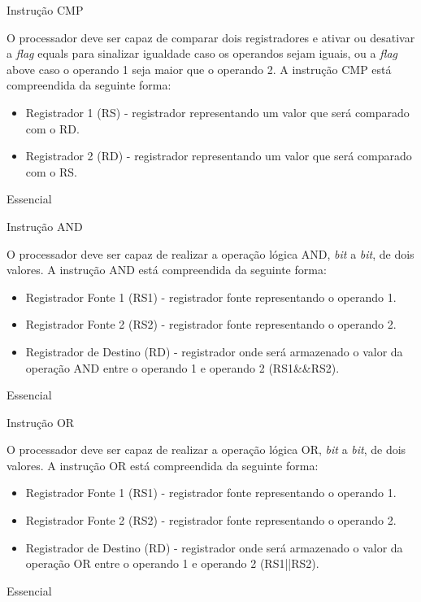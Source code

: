 \documentclass{article}
\begin{document}
\begin{functional}
     \requirement
      {Instrução CMP}
      {O processador deve ser capaz de comparar dois registradores e ativar ou desativar a \textit{flag} equals para sinalizar igualdade caso os operandos sejam iguais, ou a \textit{flag} above caso o operando 1 seja maior que o operando 2.
      A instrução CMP está compreendida da seguinte forma:\\
      \begin{itemize}
       \item Registrador 1 (RS) - registrador representando um valor que será comparado com o RD.
       \item Registrador 2 (RD) - registrador representando um valor que será comparado com o RS.
      \end{itemize}
      }
      {Essencial}

      \requirement
      {Instrução AND}
      {O processador deve ser capaz de realizar a operação lógica AND, \textit{bit} a \textit{bit}, de dois valores.
      A instrução AND está compreendida da seguinte forma:\\
       \begin{itemize}
        \item Registrador Fonte 1 (RS1) - registrador fonte representando o operando 1.
        \item Registrador Fonte 2 (RS2) - registrador fonte representando o operando 2.
        \item Registrador de Destino (RD) - registrador onde será armazenado o valor da operação AND entre o operando 1 e operando 2 (RS1\&\&RS2).
       \end{itemize}
       }
      {Essencial}

      \requirement
      {Instrução OR}
      {O processador deve ser capaz de realizar a operação lógica OR, \textit{bit} a \textit{bit}, de dois valores.
      A instrução OR está compreendida da seguinte forma:\\
       \begin{itemize}
        \item Registrador Fonte 1 (RS1) - registrador fonte representando o operando 1.
        \item Registrador Fonte 2 (RS2) - registrador fonte representando o operando 2.
        \item Registrador de Destino (RD) - registrador onde será armazenado o valor da operação OR entre o operando 1 e operando 2 (RS1||RS2).
       \end{itemize}
       }
      {Essencial}


\end{functional}
\end{document}
